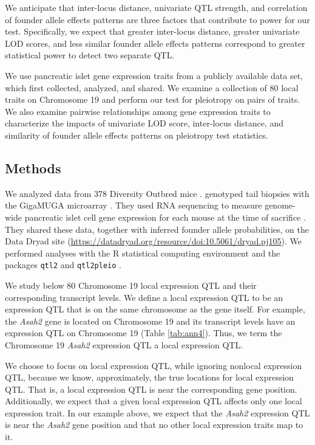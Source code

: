 \documentclass[oneside]{book}
\begin{document}
We anticipate that inter-locus distance, univariate QTL strength, and correlation of founder allele effects patterns are three factors that contribute to power for our test. Specifically, we expect that greater inter-locus distance, greater univariate LOD scores, and less similar founder allele effects patterns correspond to greater statistical power to detect two separate QTL.

We use pancreatic islet gene expression traits from a publicly available data set, which \citet{keller2018genetic} first collected, analyzed, and shared. We examine a collection of 80 local traits on Chromosome 19 and perform our test for pleiotropy on pairs of traits. We also examine pairwise relationships among gene expression traits to characterize the impacts of univariate LOD score, inter-locus distance, and similarity of founder allele effects patterns on pleiotropy test statistics.



\subsection{Methods}


We analyzed data from 378 Diversity Outbred mice \citep{keller2018genetic}. \citet{keller2018genetic} genotyped tail biopsies with the GigaMUGA microarray \citep{morgan2016mouse}. They used RNA sequencing to measure genome-wide pancreatic islet cell gene expression for each mouse at the time of sacrifice \citep{keller2018genetic}. They shared these data, together with inferred founder allele probabilities, on the Data Dryad site (\url{https://datadryad.org/resource/doi:10.5061/dryad.pj105}). We performed analyses with the R statistical computing environment \citep{r} and the packages \texttt{qtl2} \citep{qtl2} and \texttt{qtl2pleio} \citep{qtl2pleio}.


We study below 80 Chromosome 19 local expression QTL and their corresponding transcript levels. We define a local expression QTL to be an expression QTL that is on the same chromosome as the gene itself. For example, the \emph{Asah2} gene is located on Chromosome 19 and its transcript levels have an expression QTL on Chromosome 19 (Table \ref{tab:ann4}). Thus, we term the Chromosome 19 \emph{Asah2} expression QTL a local expression QTL.

We choose to focus on local expression QTL, while ignoring nonlocal expression QTL, because we know, approximately, the true locations for local expression QTL. That is, a local expression QTL is near the corresponding gene position. Additionally, we expect that a given local expression QTL affects only one local expression trait. In our example above, we expect that the \emph{Asah2} expression QTL is near the \emph{Asah2} gene position and that no other local expression traits map to it.
\end{document}
